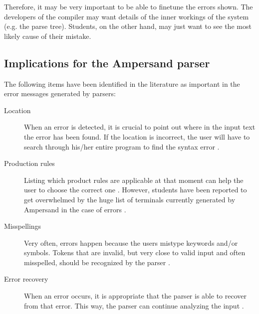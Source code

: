 Therefore, it may be very important to be able to finetune the errors shown.
The developers of the compiler may want details of the inner workings of the system (e.g. the parse tree).
Students, on the other hand, may just want to see the most likely cause of their mistake.

\subsection{Implications for the Ampersand parser}
\label{subsec:errors-ampersand}
The following items have been identified in the literature as important in the error messages generated by parsers:
\begin{description}
	\item[Location] When an error is detected, it is crucial to point out where in the input text the error has been found.
		If the location is incorrect, the user will have to search through his/her entire program to find the syntax error \cite{helium-parser,uu-doc,error-correcting,parsec}.
	\item[Production rules] Listing which product rules are applicable at that moment can help the user to choose the correct one \cite{helium-parser}.
		However, students have been reported to get overwhelmed by the huge list of terminals currently generated by Ampersand in the case of errors \cite{heeren-error}. 
	\item[Misspellings] Very often, errors happen because the users mistype keywords and/or symbols.
		Tokens that are invalid, but very close to valid input and often misspelled, should be recognized by the parser \cite{helium-parser,error-recovery}.
	\item[Error recovery] When an error occurs, it is appropriate that the parser is able to recover from that error.
		This way, the parser can continue analyzing the input \cite{error-correcting,error-recovery}.
\end{description}
